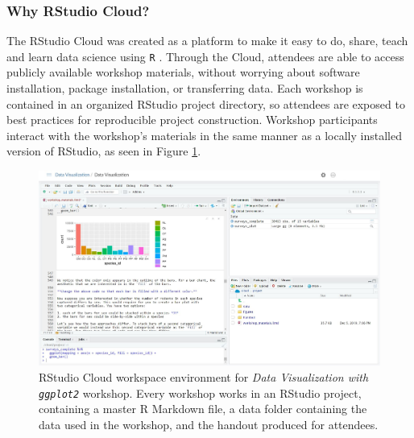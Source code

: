 \documentclass[12pt]{article}
\begin{document}
\subsubsection{Why RStudio Cloud?} 

\quad The RStudio Cloud was created as a platform to make it easy to do, share,
teach and learn data science using \texttt{R} \citep{RStudioCloud}. Through the 
Cloud, attendees are able to access publicly available workshop materials, 
without worrying about software installation, package installation, or
transferring data. Each workshop is contained in an organized RStudio project
directory, so attendees are exposed to best practices for reproducible project 
construction. Workshop participants interact with the workshop's materials in
the same manner as a locally installed version of RStudio, as seen in Figure
\ref{fig:cloud}. 

\begin{figure}[t!]
    \centering
    \includegraphics[width = \textwidth]{images/RStudio_Cloud_blind.png}
    \caption{RStudio Cloud workspace environment for \emph{Data Visualization
    with \texttt{ggplot2}} workshop. Every workshop works in an RStudio project,
    containing a master R Markdown file, a data folder containing the
    data used in the workshop, and the handout produced for attendees.} 
    \label{fig:cloud}
\end{figure}

% 
\end{document}
